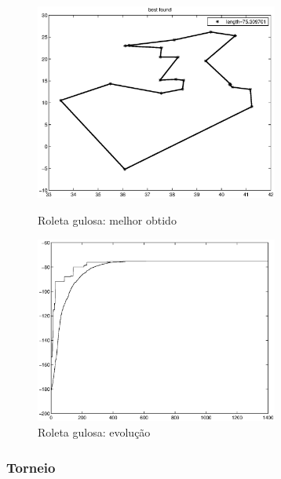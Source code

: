 \documentclass[a4paper]{article}
\begin{document}
\begin{figure}
\begin{minipage}[b]{0.5\linewidth} %
\centering
\includegraphics[width=8cm]{roleta_greedy_best}
\caption{Roleta gulosa: melhor obtido}
\label{fig:roleta_greedy_best}
\end{minipage}
\hspace{0.5cm} %
\begin{minipage}[b]{0.5\linewidth}
\centering
\includegraphics[width=8cm]{roleta_greedy_evol}
\caption{Roleta gulosa: evolução}
\label{fig:roleta_greedy_evol}
\end{minipage}
\end{figure}

\subsubsection{Torneio}
\end{document}
